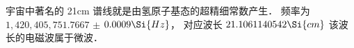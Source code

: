 
宇宙中著名的 21cm 谱线就是由氢原子基态的超精细常数产生． 频率为 $1,420,405,751.7667$ $\pm$ $0.0009 \Si{Hz}$， 对应波长 $21.1061140542\Si{cm}$ 该波长的电磁波属于微波．
